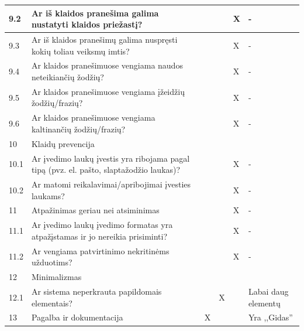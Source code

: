 \documentclass{VUMIFPSkursinis}
\begin{document}
\begin{longtable}[c]{|p{1cm}|p{4cm}|p{1cm}|p{1cm}|p{1.6cm}|p{4cm}|}
9.2   & Ar iš klaidos pranešima galima nustatyti klaidos priežastį?                                          &     &     &     X     &   -         \\ \hline
9.3   & Ar iš klaidos pranešimų galima nuspręsti kokių toliau veiksmų imtis?                                 &     &     &     X     &   -         \\ \hline
9.4   & Ar klaidos pranešimuose vengiama naudos neteikiančių žodžių?                                         &     &     &     X     &   -         \\ \hline
9.5   & Ar klaidos pranešimuose vengiama įžeidžių žodžių/frazių?                                             &     &     &     X     &   -         \\ \hline
9.6   & Ar klaidos pranešimuose vengiama kaltinančių žodžių/frazių?                                          &     &     &     X     &   -         \\ \hline
10    & \multicolumn{5}{l|}{Klaidų prevencija}                                                                                                     \\ \hline
10.1  & Ar įvedimo laukų įvestis yra ribojama pagal tipą (pvz. el. pašto, slaptažodžio laukas)?              &     &     &     X     &   -         \\ \hline
10.2  & Ar matomi reikalavimai/apribojimai įvesties laukams?                                                 &     &     &     X     &   -         \\ \hline
11    & Atpažinimas geriau nei atsiminimas                                                                   &     &     &     X     &   -         \\ \hline
11.1  & Ar įvedimo laukų įvedimo formatas yra atpažįstamas ir jo nereikia prisiminti?                        &     &     &     X     &   -         \\ \hline
11.2  & Ar vengiama patvirtinimo nekritinėms užduotims?                                                      &     &     &     X     &   -         \\ \hline
12    & \multicolumn{5}{l|}{Minimalizmas}                                                                                                          \\ \hline
12.1  & Ar sistema neperkrauta papildomais elementais?                                                       &     &  X  &           &   Labai daug elementų         \\ \hline
13    & Pagalba ir dokumentacija                                                                             &  X  &     &           &   Yra ,,Gidas''          \\ \hline

\end{longtable}
\end{document}
